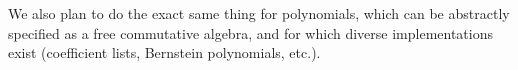 \documentclass[a4paper,10pt,runningheads]{llncs}
\begin{document}
We also plan to do the exact same thing for polynomials, which can be abstractly specified as a free commutative algebra, and for which diverse implementations exist (coefficient lists, Bernstein polynomials, etc.).





\end{document}
